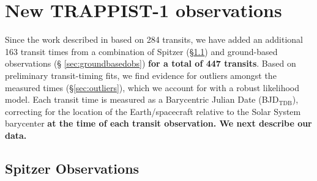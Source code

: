 \documentclass[twocolumn]{aastex63}
\begin{document}
\section{New TRAPPIST-1 observations} \label{sec:observations}

Since the work described in \citet{Grimm2018} based on 284 transits, we
have added an additional 163 transit times from a combination of Spitzer
(\S \ref{sec:spitzerobs}) and ground-based observations (\S
\ref{sec:groundbasedobs}) \textbf{for a total of 447 transits}.  Based 
on preliminary transit-timing fits, we find evidence for outliers amongst 
the measured times (\S \ref{sec:outliers}), which we account for with a robust 
likelihood model.  Each transit time is measured as a Barycentric Julian Date 
(BJD$_\mathrm{TDB}$), correcting for the location of the Earth/spacecraft relative 
to the Solar System barycenter \citep{Eastman2010} \textbf{at the time of each
transit observation.  We next describe our data.}



\subsection{Spitzer Observations} \label{sec:spitzerobs}
\end{document}
